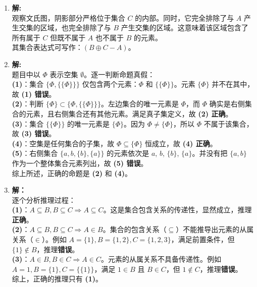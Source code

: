 \begin{enumerate}
	\item \textbf{解:}\\
	观察文氏图，阴影部分严格位于集合 $C$ 的内部。同时，它完全排除了与 $A$ 产生交集的区域，也完全排除了与 $B$ 产生交集的区域。这意味着该区域包含了所有属于 $C$ 但既不属于 $A$ 也不属于 $B$ 的元素。\\
	其集合表达式可写作：$(B \oplus C - A)$。
	
	\vspace{1em}
	
	\item \textbf{解:}\\
	题目中以 $\Phi$ 表示空集 $\emptyset$。逐一判断命题真假：\\
	\textbf{(1)}：集合 $\{\Phi, \{\{\Phi\}\}\}$ 仅包含两个元素：$\Phi$ 和 $\{\{\Phi\}\}$。元素 $\{\Phi\}$ 并不在其中，故 \textbf{(1) 错误}。\\
	\textbf{(2)}：判断 $\{\Phi\} \subset \{\Phi, \{\{\Phi\}\}\}$。左边集合的唯一元素是 $\Phi$，而 $\Phi$ 确实是右侧集合的元素，且右侧集合还有其他元素。满足真子集定义，故 \textbf{(2) 正确}。\\
	\textbf{(3)}：集合 $\{\{\Phi\}\}$ 的唯一元素是 $\{\Phi\}$。因为 $\Phi \neq \{\Phi\}$，所以 $\Phi$ 不属于该集合，故 \textbf{(3) 错误}。\\
	\textbf{(4)}：空集是任何集合的子集，故 $\Phi \subseteq \{\Phi\}$ 恒成立，故 \textbf{(4) 正确}。\\
	\textbf{(5)}：右侧集合 $\{a,b, \{b\}, \{a\}\}$ 的元素依次是 $a$, $b$, $\{b\}$, $\{a\}$。并没有把 $\{a,b\}$ 作为一个整体集合元素列出，故 \textbf{(5) 错误}。\\
	综上所述，正确的命题是 \textbf{(2)} 和 \textbf{(4)}。
	
	\vspace{1em}
	
	\item \textbf{解：}\\
	逐个分析推理过程：\\
	\textbf{(1)}：$A \subseteq B, B \subseteq C \Rightarrow A \subseteq C$。这是集合包含关系的传递性，显然成立，推理\textbf{正确}。\\
	\textbf{(2)}：$A \subseteq B, B \subseteq C \Rightarrow A \in B$。集合的包含关系（$\subseteq$）不能推导出元素的从属关系（$\in$）。例如 $A=\{1\}, B=\{1,2\}, C=\{1,2,3\}$，满足前置条件，但 $\{1\} \notin B$，推理\textbf{错误}。\\
	\textbf{(3)}：$A \in B, B \in C \Rightarrow A \in C$。元素的从属关系不具备传递性。例如 $A=1, B=\{1\}, C=\{\{1\}\}$，满足 $1 \in B$ 且 $B \in C$，但 $1 \notin C$，推理\textbf{错误}。\\
	综上，正确的推理只有 \textbf{(1)}。
	

\end{enumerate}

